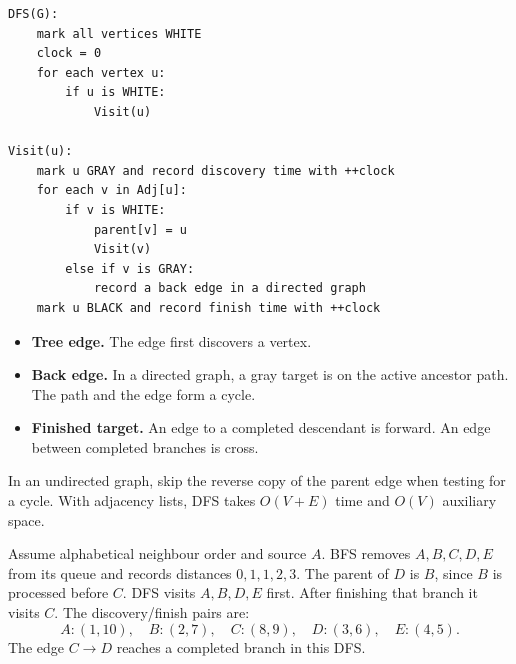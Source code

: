 \documentclass[12pt,a4paper]{article}
\begin{document}
\begin{tcolorbox}[formulabox, title={DFS with discovery and finishing times}]
\begin{verbatim}
DFS(G):
    mark all vertices WHITE
    clock = 0
    for each vertex u:
        if u is WHITE:
            Visit(u)

Visit(u):
    mark u GRAY and record discovery time with ++clock
    for each v in Adj[u]:
        if v is WHITE:
            parent[v] = u
            Visit(v)
        else if v is GRAY:
            record a back edge in a directed graph
    mark u BLACK and record finish time with ++clock
\end{verbatim}
\end{tcolorbox}

\begin{itemize}[leftmargin=*, itemsep=2pt]
  \item \textbf{Tree edge.} The edge first discovers a vertex.
  \item \textbf{Back edge.} In a directed graph, a gray target is on the active ancestor path. The path and the edge form a cycle.
  \item \textbf{Finished target.} An edge to a completed descendant is forward. An edge between completed branches is cross.
\end{itemize}
In an undirected graph, skip the reverse copy of the parent edge when testing for a cycle. With adjacency lists, DFS takes $O(V+E)$ time and $O(V)$ auxiliary space.
\begin{tcolorbox}[tikzbox, title={Directed graph for the traversal and ordering traces}]
\centering
{}\par
\end{tcolorbox}

\begin{tcolorbox}[examplebox, title={BFS levels and DFS times}]
Assume alphabetical neighbour order and source $A$. BFS removes $A,B,C,D,E$ from its queue and records distances $0,1,1,2,3$. The parent of $D$ is $B$, since $B$ is processed before $C$. DFS visits $A,B,D,E$ first. After finishing that branch it visits $C$. The discovery/finish pairs are:
\[
A:(1,10),\quad B:(2,7),\quad C:(8,9),\quad D:(3,6),\quad E:(4,5).
\]
The edge $C\to D$ reaches a completed branch in this DFS.
\end{tcolorbox}
\end{document}
